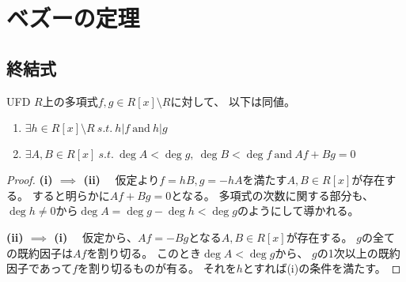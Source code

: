 \documentclass[a4]{article}
\begin{document}
    \section{ベズーの定理}
        \subsection{終結式}
            \begin{Lemma}
                UFD $R$上の多項式$f, g \in R[x] \setminus R$に対して、
                以下は同値。
                \begin{enumerate}
                    \renewcommand{\labelenumi}{(\roman{enumi})}
                    \item $\exists h \in R[x] \setminus R ~s.t.~ h|f ~\mbox{and}~ h|g$
                    \item $\exists A,B \in R[x] ~s.t.~ \deg A<\deg g,~ \deg B<\deg f ~\mbox{and}~ Af+Bg=0$
                \end{enumerate}
            \end{Lemma}
            \begin{proof}
                \textbf{(i) $\implies$ (ii)}~~
                    仮定より$f=hB, g=-hA$を満たす$A, B \in  R[x]$が存在する。
                    すると明らかに$Af+Bg=0$となる。
                    多項式の次数に関する部分も、
                    $\deg h \neq 0$から$\deg A=\deg g - \deg h<\deg g$のようにして導かれる。

                \textbf{(ii) $\implies$ (i)}~~
                    仮定から、$Af=-Bg$となる$A, B \in R[x]$が存在する。
                    $g$の全ての既約因子は$Af$を割り切る。
                    このとき$\deg A < \deg g$から、
                    $g$の1次以上の既約因子であって$f$を割り切るものが有る。
                    それを$h$とすれば(i)の条件を満たす。
                
            \end{proof}
\end{document}
